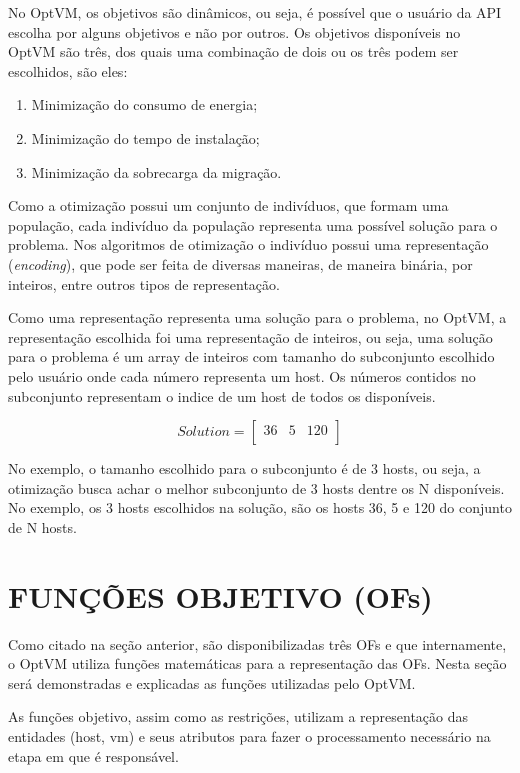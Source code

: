 No OptVM, os objetivos são dinâmicos, ou seja, é possível que o usuário da API escolha por alguns
objetivos e não por outros. Os objetivos disponíveis no OptVM são três, dos quais uma combinação de
dois ou os três podem ser escolhidos, são eles:

\begin{enumerate}
\item Minimização do consumo de energia;
\item Minimização do tempo de instalação;
\item Minimização da sobrecarga da migração.
\end{enumerate}

Como a otimização possui um conjunto de indivíduos, que formam uma população, cada indivíduo
da população representa uma possível solução para o problema.  Nos algoritmos de 
otimização o indivíduo possui uma representação (\textit{encoding}), que pode ser feita
de diversas maneiras, de maneira binária, por inteiros, entre outros tipos de representação.

Como uma representação representa uma solução para o problema, no OptVM, a 
representação escolhida foi uma representação de inteiros, ou seja, uma solução
para o problema é um array de inteiros com tamanho do subconjunto escolhido pelo
usuário onde cada número representa um host. Os números contidos no subconjunto
representam o indice de um host de todos os disponíveis.

\[
  Solution=
  \left[{\begin{array}{cccccc}
    36 & 5 & 120 \\
  \end{array}}\right
  ]
\]

No exemplo, o tamanho escolhido para o subconjunto é de 3 hosts, ou seja, 
a otimização busca achar o melhor subconjunto de 3 hosts dentre os N disponíveis. 
No exemplo, os 3 hosts escolhidos na solução, são os hosts 36, 5 e 120 do conjunto de N hosts.

\section{FUNÇÕES OBJETIVO (OFs)}
Como citado na seção anterior, são disponibilizadas três OFs e que internamente, o OptVM
utiliza funções matemáticas para a representação das OFs. Nesta seção será demonstradas e
explicadas as funções utilizadas pelo OptVM.

As funções objetivo, assim como as restrições, utilizam a representação das entidades 
(host, vm) e seus atributos para fazer o processamento necessário na etapa em que é responsável.

